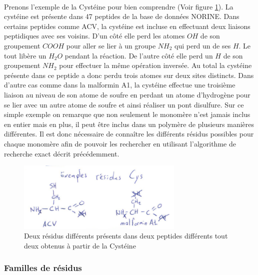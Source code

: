 \documentclass[12pt,french,twoside]{report}
\begin{document}
\paragraph{}Prenons l'exemple de la Cystéine pour bien comprendre (Voir figure \ref{cys_ex}).
La cystéine est présente dans 47 peptides de la base de données
NORINE. Dans certains peptides comme ACV, la cystéine est incluse en effectuant deux liaisons peptidiques avec ses voisins. D'un
côté elle perd les atomes $OH$ de son groupement $COOH$ pour aller se lier à un groupe $NH_2$ qui perd un de ses $H$. Le tout
libère un $H_2O$ pendant la réaction. De l'autre côté elle perd un $H$ de son groupement $NH_2$ pour effectuer la même opération
inversée. Au total la cystéine présente dans ce peptide a donc perdu trois atomes sur deux sites distincts. Dans d'autre cas
comme dans la malformin A1, la cystéine effectue une troisième liaison au niveau de son atome de soufre en perdant un atome 
d'hydrogène pour se lier avec un autre atome de soufre et ainsi réaliser un pont disulfure. Sur ce simple exemple on remarque que
non seulement le monomère n'est jamais inclus en entier mais en plus, il peut être inclus dans un polymère de plusieurs manières
différentes. Il est donc nécessaire de connaître les différents résidus possibles pour chaque monomère afin de pouvoir les
rechercher en utilisant l'algorithme de recherche exact décrit précédemment.

\begin{figure}
  \includegraphics[width=300px]{Figures/s2m/residues/cys_exemple.pdf}
  \caption{\label{cys_ex}Deux résidus différents présents dans deux peptides différents tout deux obtenus à partir de la Cystéine}
\end{figure}


\subsubsection{Familles de résidus}
\end{document}
